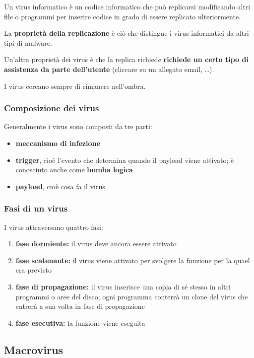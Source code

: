 Un virus informatico è un codice informatico che
può replicarsi modificando altri file o programmi
per inserire codice in grado di essere replicato
ulteriormente.

La \textbf{proprietà della replicazione} è ciò che distingue i virus
informatici da altri tipi di malware.

Un'altra proprietà dei virus è che la replica richiede \textbf{richiede un
certo tipo di assistenza da parte dell'utente} (cliccare su un allegato email, \dots).

I virus cercano sempre di rimanere nell'ombra.

\subsubsection{Composizione dei virus}
Generalmente i virus sono composti da tre parti:
\begin{itemize}
    \item \textbf{meccanismo di infezione}
    \item \textbf{trigger}, cioè l'evento che determina quando il payload viene attivato; è conosciuto anche come \textbf{bomba logica}
    \item \textbf{payload}, cioè cosa fa il virus
\end{itemize}

\subsubsection{Fasi di un virus}
I virus attraversano quattro fasi:
\begin{enumerate}
    \item \textbf{fase dormiente:} il virus deve ancora essere attivato
    \item \textbf{fase scatenante:} il virus viene attivato per svolgere la funzione per la quael era previsto
    \item \textbf{fase di propagazione:} il virus inserisce una copia di sé stesso in altri programmi o aree del disco; ogni programma conterrà 
    un clone del virus che entrerà a sua volta in fase di propagazione
    \item \textbf{fase esecutiva:} la funzione viene eseguita
\end{enumerate}

\subsection{Macrovirus}

